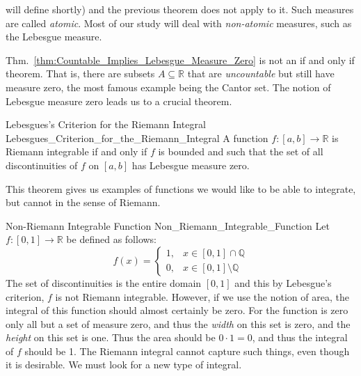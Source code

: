 \documentclass[crop=false,class=article]{standalone}                           %
\begin{document}
        will define shortly) and the previous theorem does not apply to it. Such
        measures are called \textit{atomic}. Most of our study will deal with
        \textit{non-atomic} measures, such as the Lebesgue measure.
        \par\hfill\par
        Thm.~\ref{thm:Countable_Implies_Lebesgue_Measure_Zero} is not an if and
        only if theorem. That is, there are subsets $A\subseteq\mathbb{R}$ that
        are \textit{uncountable} but still have measure zero, the most famous
        example being the Cantor set. The notion of Lebesgue measure zero leads
        us to a crucial theorem.
        \begin{ltheorem}{Lebesgues's Criterion for the Riemann Integral}
                        {Lebesgues_Criterion_for_the_Riemann_Integral}
            A function $f:[a,b]\rightarrow\mathbb{R}$ is Riemann integrable
            if and only if $f$ is bounded and such that the set of all
            discontinuities of $f$ on $[a,b]$ has Lebesgue measure zero.
        \end{ltheorem}
        This theorem gives us examples of functions we would like to be
        able to integrate, but cannot in the sense of Riemann.
        \begin{lexample}{Non-Riemann Integrable Function}
                        {Non_Riemann_Integrable_Function}
            Let $f:[0,1]\rightarrow\mathbb{R}$ be defined as follows:
            \begin{equation}
                f(x)=
                \begin{cases}
                    1,&x\in[0,1]\cap\mathbb{Q}\\
                    0,&x\in[0,1]\setminus\mathbb{Q}
                \end{cases}
            \end{equation}
            The set of discontinuities is the entire domain $[0,1]$ and
            this by Lebesgue's criterion, $f$ is not Riemann integrable.
            However, if we use the notion of area, the integral of this
            function should almost certainly be zero. For the function is
            zero only all but a set of measure zero, and thus the
            \textit{width} on this set is zero, and the \textit{height} on
            this set is one. Thus the area should be $0\cdot{1}=0$, and thus
            the integral of $f$ should be 1. The Riemann integral cannot
            capture such things, even though it is desirable. We must look
            for a new type of integral.
        \end{lexample}
\end{document}
